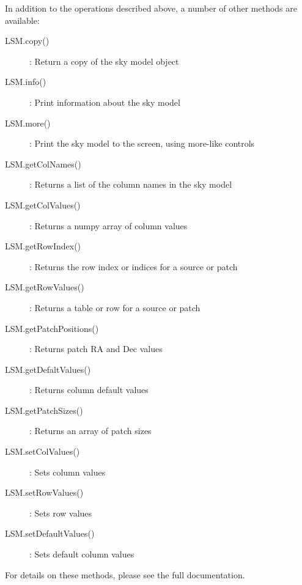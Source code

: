 \documentclass[structabstract]{article}
\begin{document}
In addition to the operations described above, a number of other methods are available:
\begin{description}
 \item[LSM.copy()]: Return a copy of the sky model object
 \item[LSM.info()]: Print information about the sky model
 \item[LSM.more()]: Print the sky model to the screen, using more-like controls
 \item[LSM.getColNames()]: Returns a list of the column names in the sky model
 \item[LSM.getColValues()]: Returns a numpy array of column values
 \item[LSM.getRowIndex()]: Returns the row index or indices for a source or patch
 \item[LSM.getRowValues()]: Returns a table or row for a source or patch
 \item[LSM.getPatchPositions()]: Returns patch RA and Dec values
 \item[LSM.getDefaltValues()]: Returns column default values
 \item[LSM.getPatchSizes()]: Returns an array of patch sizes
 \item[LSM.setColValues()]: Sets column values
 \item[LSM.setRowValues()]: Sets row values
 \item[LSM.setDefaultValues()]: Sets default column values
\end{description}
For details on these methods, please see the full documentation.
\end{document}
